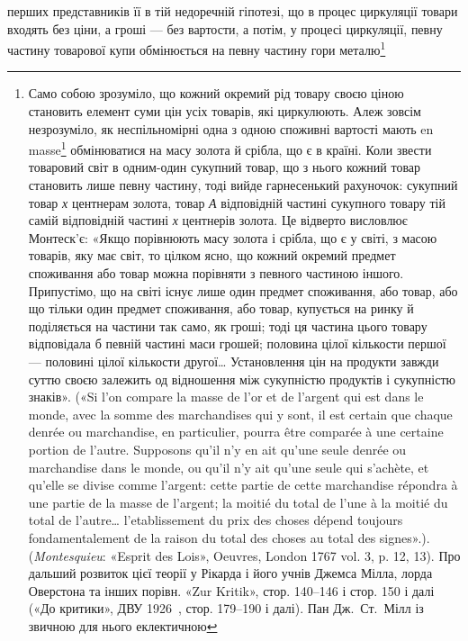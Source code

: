 \parcont{}  %
перших представників її в тій недоречній гіпотезі, що в процес
циркуляції товари входять без ціни, а гроші — без вартости, а
потім, у процесі циркуляції, певну частину товарової купи обмінюється
на певну частину гори металю\footnote{
Само собою зрозуміло, що кожний окремий рід товару своєю ціною
становить елемент суми цін усіх товарів, які циркулюють. Алеж зовсім
незрозуміло, як неспільномірні одна з одною споживні вартості мають
en masse\footnote*{
— всією масою. \emph{Ред.}
} обмінюватися на масу золота й срібла, що є в країні. Коли
звести товаровий світ в одним-один сукупний товар, що з нього кожний
товар становить лише певну частину, тоді вийде гарнесенький рахуночок:
сукупний товар \deq{} \emph{х} центнерам золота, товар \emph{А} \deq{} відповідній частині
сукупного товару \deq{} тій самій відповідній частині \emph{х} центнерів золота. Це
відверто висловлює Монтеск’є: «Якщо порівнюють масу золота і срібла,
що є у світі, з масою товарів, яку має світ, то цілком ясно, що кожний
окремий предмет споживання або товар можна порівняти з певного частиною
іншого. Припустімо, що на світі існує лише один предмет споживання,
або товар, або що тільки один предмет споживання, або товар, купується
на ринку й поділяється на частини так само, як гроші; тоді ця частина
цього товару відповідала б певній частині маси грошей; половина цілої
кількости першої — половині цілої кількости другої\dots{} Установлення цін
на продукти завжди суттю своєю залежить од відношення між сукупністю
продуктів і сукупністю знаків». («Si l’on compare la masse de l’or et
de l’argent qui est dans le monde, avec la somme des marchandises qui y
sont, il est certain que chaque denrée ou marchandise, en particulier, pourra
être comparée à une certaine portion de l’autre. Supposons qu’il n’y en ait
qu’une seule denrée ou marchandise dans le monde, ou qu’il n’y ait qu’une
seule qui s’achète, et qu’elle se divise comme l’argent: cette partie de cette marchandise
répondra à une partie de la masse de l’argent; la moitié du total
de l’une à la moitié du total de l’autre\dots{} l’etablissement du prix des choses
dépend toujours fondamentalement de la raison du total des choses au
total des signes».). (\emph{Montesquieu}: «Esprit des Lois», Oeuvres, London
1767 vol. 3, p. 12, 13). Про дальший розвиток цієї теорії у Рікарда
і його учнів Джемса Мілла, лорда Оверстона та інших порівн. «Zur
Kritik», стор. 140--146 і стор. 150 і далі («До критики», ДВУ 1926~,
стор. 179--190 і далі). Пан Дж.~Ст.~Мілл із звичною для нього еклектичною
}
